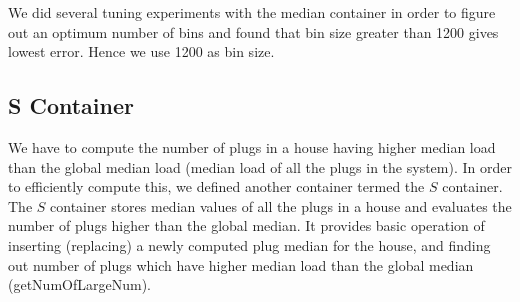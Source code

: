 We did several tuning experiments with the median container in order to figure out an optimum number of bins and found that bin size greater than 1200 gives lowest error. Hence we use 1200 as bin size.

\subsection{S Container}
We have to compute the number of plugs in a house having higher median load than the global median load (median load of all the plugs in the system).
In order to efficiently compute this, we defined another container termed the $S$ container.
The $S$ container stores median values of all the plugs in a house and evaluates the number of plugs higher than the global median.
It provides basic operation of inserting (replacing) a newly computed plug median for the house, and finding out number of plugs which have higher median load than the global median (getNumOfLargeNum).

